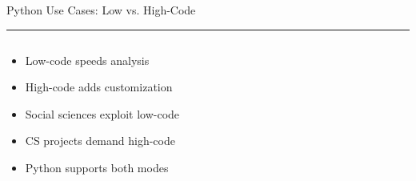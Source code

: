 \documentclass[aspectratio=169]{beamer}
\newcommand{\TitleFont}{\rmfamily}
\begin{document}
\begin{frame}[t]{}
  \vspace*{0.5cm}
  {\TitleFont\fontsize{18}{22}\selectfont\color{LUBronze}Python Use Cases: Low vs. High-Code\par}
  \vspace{0.3em}
  {\color{LUBronze}\rule{\linewidth}{0.8pt}}\par
  \vspace{0.2cm}
  \begin{columns}[t]
    \begin{column}[t]{0.4\textwidth}
      \vspace*{0pt}
      \begin{itemize}\setlength\itemsep{0.65em}
        \item Low-code speeds analysis
        \item High-code adds customization
        \item Social sciences exploit low-code
        \item CS projects demand high-code
        \item Python supports both modes
      \end{itemize}
    \end{column}
  \end{columns}
\end{frame}
\end{document}
